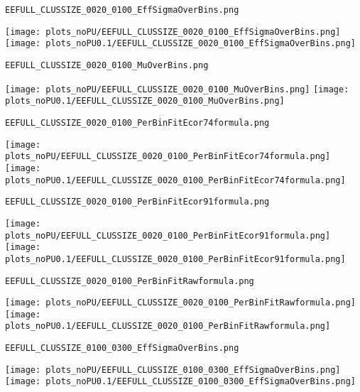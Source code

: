 \begin{frame}[fragile]
\begin{verbatim}
EEFULL_CLUSSIZE_0020_0100_EffSigmaOverBins.png
\end{verbatim}
\texttt{[image: plots\_noPU/EEFULL\_CLUSSIZE\_0020\_0100\_EffSigmaOverBins.png]}
\texttt{[image: plots\_noPU0.1/EEFULL\_CLUSSIZE\_0020\_0100\_EffSigmaOverBins.png]}
\end{frame}
\begin{frame}[fragile]
\begin{verbatim}
EEFULL_CLUSSIZE_0020_0100_MuOverBins.png
\end{verbatim}
\texttt{[image: plots\_noPU/EEFULL\_CLUSSIZE\_0020\_0100\_MuOverBins.png]}
\texttt{[image: plots\_noPU0.1/EEFULL\_CLUSSIZE\_0020\_0100\_MuOverBins.png]}
\end{frame}
\begin{frame}[fragile]
\begin{verbatim}
EEFULL_CLUSSIZE_0020_0100_PerBinFitEcor74formula.png
\end{verbatim}
\texttt{[image: plots\_noPU/EEFULL\_CLUSSIZE\_0020\_0100\_PerBinFitEcor74formula.png]}
\texttt{[image: plots\_noPU0.1/EEFULL\_CLUSSIZE\_0020\_0100\_PerBinFitEcor74formula.png]}
\end{frame}
\begin{frame}[fragile]
\begin{verbatim}
EEFULL_CLUSSIZE_0020_0100_PerBinFitEcor91formula.png
\end{verbatim}
\texttt{[image: plots\_noPU/EEFULL\_CLUSSIZE\_0020\_0100\_PerBinFitEcor91formula.png]}
\texttt{[image: plots\_noPU0.1/EEFULL\_CLUSSIZE\_0020\_0100\_PerBinFitEcor91formula.png]}
\end{frame}
\begin{frame}[fragile]
\begin{verbatim}
EEFULL_CLUSSIZE_0020_0100_PerBinFitRawformula.png
\end{verbatim}
\texttt{[image: plots\_noPU/EEFULL\_CLUSSIZE\_0020\_0100\_PerBinFitRawformula.png]}
\texttt{[image: plots\_noPU0.1/EEFULL\_CLUSSIZE\_0020\_0100\_PerBinFitRawformula.png]}
\end{frame}
\begin{frame}[fragile]
\begin{verbatim}
EEFULL_CLUSSIZE_0100_0300_EffSigmaOverBins.png
\end{verbatim}
\texttt{[image: plots\_noPU/EEFULL\_CLUSSIZE\_0100\_0300\_EffSigmaOverBins.png]}
\texttt{[image: plots\_noPU0.1/EEFULL\_CLUSSIZE\_0100\_0300\_EffSigmaOverBins.png]}
\end{frame}
